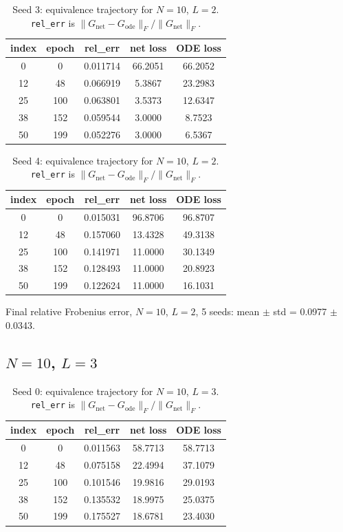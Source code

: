 \begin{table}[H]
\centering
\caption{Seed 3: equivalence trajectory for $N=10$, $L=2$. \texttt{rel\_err} is $\|G_{\mathrm{net}} - G_{\mathrm{ode}}\|_F / \|G_{\mathrm{net}}\|_F$.}
\label{tab:equiv-N10-L2-s3}
\begin{tabular}{c c c c c}
\toprule
index & epoch & rel\_err & net loss & ODE loss \\
\midrule
0 & 0 & 0.011714 & 66.2051 & 66.2052 \\
12 & 48 & 0.066919 & 5.3867 & 23.2983 \\
25 & 100 & 0.063801 & 3.5373 & 12.6347 \\
38 & 152 & 0.059544 & 3.0000 & 8.7523 \\
50 & 199 & 0.052276 & 3.0000 & 6.5367 \\
\bottomrule
\end{tabular}
\end{table}

\begin{table}[H]
\centering
\caption{Seed 4: equivalence trajectory for $N=10$, $L=2$. \texttt{rel\_err} is $\|G_{\mathrm{net}} - G_{\mathrm{ode}}\|_F / \|G_{\mathrm{net}}\|_F$.}
\label{tab:equiv-N10-L2-s4}
\begin{tabular}{c c c c c}
\toprule
index & epoch & rel\_err & net loss & ODE loss \\
\midrule
0 & 0 & 0.015031 & 96.8706 & 96.8707 \\
12 & 48 & 0.157060 & 13.4328 & 49.3138 \\
25 & 100 & 0.141971 & 11.0000 & 30.1349 \\
38 & 152 & 0.128493 & 11.0000 & 20.8923 \\
50 & 199 & 0.122624 & 11.0000 & 16.1031 \\
\bottomrule
\end{tabular}
\end{table}

Final relative Frobenius error, $N=10$, $L=2$, 5 seeds: mean $\pm$ std = 0.0977 $\pm$ 0.0343.

\subsection{$N=10$, $L=3$}
\begin{table}[H]
\centering
\caption{Seed 0: equivalence trajectory for $N=10$, $L=3$. \texttt{rel\_err} is $\|G_{\mathrm{net}} - G_{\mathrm{ode}}\|_F / \|G_{\mathrm{net}}\|_F$.}
\label{tab:equiv-N10-L3-s0}
\begin{tabular}{c c c c c}
\toprule
index & epoch & rel\_err & net loss & ODE loss \\
\midrule
0 & 0 & 0.011563 & 58.7713 & 58.7713 \\
12 & 48 & 0.075158 & 22.4994 & 37.1079 \\
25 & 100 & 0.101546 & 19.9816 & 29.0193 \\
38 & 152 & 0.135532 & 18.9975 & 25.0375 \\
50 & 199 & 0.175527 & 18.6781 & 23.4030 \\
\bottomrule
\end{tabular}
\end{table}

